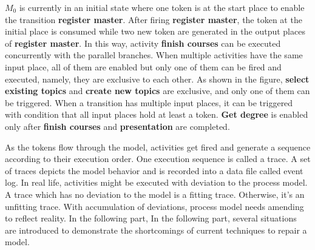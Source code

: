 $M_0$ is currently in an initial state where one token is at the start place to enable the transition \textbf{register master}. After firing \textbf{register master}, the token at the initial place is consumed while two new token are generated in the output places of \textbf{register master}. In this way, activity \textbf{finish courses}  can be executed concurrently with the parallel branches. When multiple activities have the same input place, all of them are enabled but only one of them can be fired and executed, namely, they are exclusive to each other. As shown in the figure,  \textbf{select existing topics}  and \textbf{create new topics} are exclusive, and only one of them can be triggered. When a transition has multiple input places, it can be triggered with condition that all input places hold at least a token. \textbf{Get degree} is enabled only after \textbf{finish courses} and \textbf{presentation} are completed. 


As the tokens flow through the model, activities get fired and generate a sequence according to their execution order. One execution sequence is called a trace. A set of traces depicts the model behavior and is recorded into a data file called event log. In real life, activities might be executed with deviation to the process model. A trace which has no deviation to the model is a fitting trace. Otherwise, it's an unfitting trace. With accumulation of deviations, process model needs amending to reflect reality.  In the following part, In the following part,
several situations are introduced to demonstrate the shortcomings of current techniques
to repair a model.

